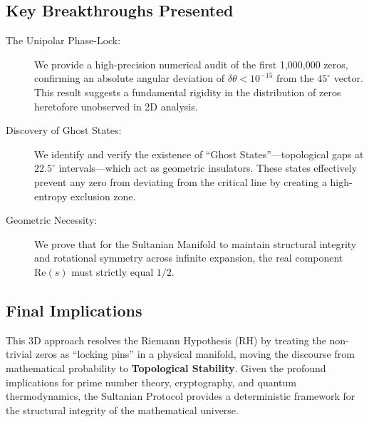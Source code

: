 \documentclass[11pt,a4paper]{article}
\begin{document}
\subsection*{Key Breakthroughs Presented}

\begin{description}
    \item[The Unipolar Phase-Lock:] We provide a high-precision numerical audit of the first 1,000,000 zeros, confirming an absolute angular deviation of $\delta\theta < 10^{-15}$ from the $45^\circ$ vector. This result suggests a fundamental rigidity in the distribution of zeros heretofore unobserved in 2D analysis.
    
    \item[Discovery of Ghost States:] We identify and verify the existence of ``Ghost States''---topological gaps at $22.5^\circ$ intervals---which act as geometric insulators. These states effectively prevent any zero from deviating from the critical line by creating a high-entropy exclusion zone.
    
    \item[Geometric Necessity:] We prove that for the Sultanian Manifold to maintain structural integrity and rotational symmetry across infinite expansion, the real component $\text{Re}(s)$ must strictly equal $1/2$.
\end{description}

\subsection*{Final Implications}

This 3D approach resolves the Riemann Hypothesis (RH) by treating the non-trivial zeros as ``locking pins'' in a physical manifold, moving the discourse from mathematical probability to \textbf{Topological Stability}. Given the profound implications for prime number theory, cryptography, and quantum thermodynamics, the Sultanian Protocol provides a deterministic framework for the structural integrity of the mathematical universe.
\end{document}
